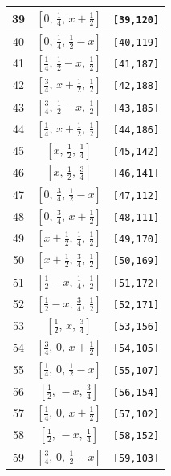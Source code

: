 \documentclass[fleqn,8pt]{jsarticle}
\begin{document}
\begin{longtable}{ccc}
39 & $\left[ 0,\, \frac{1}{4},\, x + \frac{1}{2} \right]$ & {\tt [39,120]} \\ \hline
40 & $\left[ 0,\, \frac{1}{4},\, \frac{1}{2} - x \right]$ & {\tt [40,119]} \\ \hline
41 & $\left[ \frac{1}{4},\, \frac{1}{2} - x,\, \frac{1}{2} \right]$ & {\tt [41,187]} \\ \hline
42 & $\left[ \frac{3}{4},\, x + \frac{1}{2},\, \frac{1}{2} \right]$ & {\tt [42,188]} \\ \hline
43 & $\left[ \frac{3}{4},\, \frac{1}{2} - x,\, \frac{1}{2} \right]$ & {\tt [43,185]} \\ \hline
44 & $\left[ \frac{1}{4},\, x + \frac{1}{2},\, \frac{1}{2} \right]$ & {\tt [44,186]} \\ \hline
45 & $\left[ x,\, \frac{1}{2},\, \frac{1}{4} \right]$ & {\tt [45,142]} \\ \hline
46 & $\left[ x,\, \frac{1}{2},\, \frac{3}{4} \right]$ & {\tt [46,141]} \\ \hline
47 & $\left[ 0,\, \frac{3}{4},\, \frac{1}{2} - x \right]$ & {\tt [47,112]} \\ \hline
48 & $\left[ 0,\, \frac{3}{4},\, x + \frac{1}{2} \right]$ & {\tt [48,111]} \\ \hline
49 & $\left[ x + \frac{1}{2},\, \frac{1}{4},\, \frac{1}{2} \right]$ & {\tt [49,170]} \\ \hline
50 & $\left[ x + \frac{1}{2},\, \frac{3}{4},\, \frac{1}{2} \right]$ & {\tt [50,169]} \\ \hline
51 & $\left[ \frac{1}{2} - x,\, \frac{1}{4},\, \frac{1}{2} \right]$ & {\tt [51,172]} \\ \hline
52 & $\left[ \frac{1}{2} - x,\, \frac{3}{4},\, \frac{1}{2} \right]$ & {\tt [52,171]} \\ \hline
53 & $\left[ \frac{1}{2},\, x,\, \frac{3}{4} \right]$ & {\tt [53,156]} \\ \hline
54 & $\left[ \frac{3}{4},\, 0,\, x + \frac{1}{2} \right]$ & {\tt [54,105]} \\ \hline
55 & $\left[ \frac{1}{4},\, 0,\, \frac{1}{2} - x \right]$ & {\tt [55,107]} \\ \hline
56 & $\left[ \frac{1}{2},\, - x,\, \frac{3}{4} \right]$ & {\tt [56,154]} \\ \hline
57 & $\left[ \frac{1}{4},\, 0,\, x + \frac{1}{2} \right]$ & {\tt [57,102]} \\ \hline
58 & $\left[ \frac{1}{2},\, - x,\, \frac{1}{4} \right]$ & {\tt [58,152]} \\ \hline
59 & $\left[ \frac{3}{4},\, 0,\, \frac{1}{2} - x \right]$ & {\tt [59,103]} \\ \hline

\end{longtable}
\end{document}
